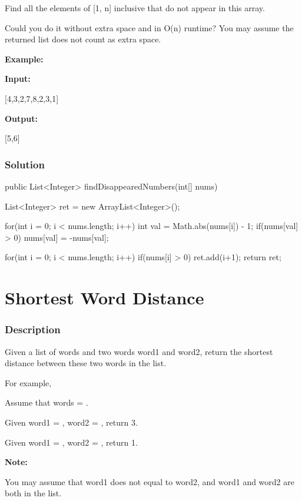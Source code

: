 Find all the elements of [1, n] inclusive that do not appear in this array.

Could you do it without extra space and in O(n) runtime? You may assume the returned list does not count as extra space.

\textbf{Example:}

\textbf{Input:}

[4,3,2,7,8,2,3,1]

\textbf{Output:}

[5,6]

\subsubsection{Solution}

\begin{Code}
public List<Integer> findDisappearedNumbers(int[] nums) {
    List<Integer> ret = new ArrayList<Integer>();

    for(int i = 0; i < nums.length; i++) {
        int val = Math.abs(nums[i]) - 1;
        if(nums[val] > 0) {
            nums[val] = -nums[val];
        }
    }

    for(int i = 0; i < nums.length; i++) {
        if(nums[i] > 0) {
            ret.add(i+1);
        }
    }
    return ret;
}
\end{Code}

\newpage

\section{Shortest Word Distance} %

\subsubsection{Description}
Given a list of words and two words word1 and word2, return the shortest distance between these two words in the list.

For example,

Assume that words = .

Given word1 = , word2 = , return 3.

Given word1 = , word2 = , return 1.

\textbf{Note:}

You may assume that word1 does not equal to word2, and word1 and word2 are both in the list.

